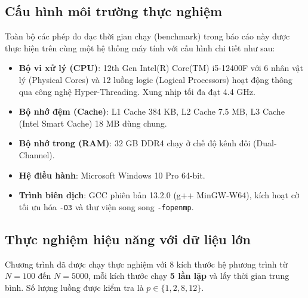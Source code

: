 \subsection{Cấu hình môi trường thực nghiệm}
Toàn bộ các phép đo đạc thời gian chạy (benchmark) trong báo cáo này được thực hiện trên cùng một hệ thống máy tính với cấu hình chi tiết như sau:
\begin{itemize}
  \item \textbf{Bộ vi xử lý (CPU)}: 12th Gen Intel(R) Core(TM) i5-12400F với 6 nhân vật lý (Physical Cores) và 12 luồng logic (Logical Processors) hoạt động thông qua công nghệ Hyper-Threading. Xung nhịp tối đa đạt 4.4 GHz.
  \item \textbf{Bộ nhớ đệm (Cache)}: L1 Cache 384 KB, L2 Cache 7.5 MB, L3 Cache (Intel Smart Cache) 18 MB dùng chung.
  \item \textbf{Bộ nhớ trong (RAM)}: 32 GB DDR4 chạy ở chế độ kênh đôi (Dual-Channel).
  \item \textbf{Hệ điều hành}: Microsoft Windows 10 Pro 64-bit.
  \item \textbf{Trình biên dịch}: GCC phiên bản 13.2.0 (g++ MinGW-W64), kích hoạt cờ tối ưu hóa \texttt{-O3} và thư viện song song \texttt{-fopenmp}.
\end{itemize}

\subsection{Thực nghiệm hiệu năng với dữ liệu lớn}
Chương trình đã được chạy thực nghiệm với 8 kích thước hệ phương trình từ $N=100$ đến $N=5000$, mỗi kích thước chạy \textbf{5 lần lặp} và lấy thời gian trung bình. Số lượng luồng được kiểm tra là $p \in \{1, 2, 8, 12\}$.

